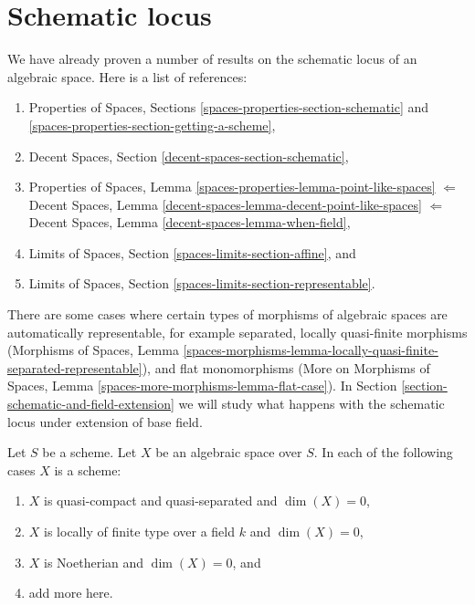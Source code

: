 \section{Schematic locus}
\label{section-schematic}

\noindent
We have already proven a number of results on the schematic locus
of an algebraic space. Here is a list of references:
\begin{enumerate}
\item Properties of Spaces, Sections
\ref{spaces-properties-section-schematic} and
\ref{spaces-properties-section-getting-a-scheme},
\item Decent Spaces, Section \ref{decent-spaces-section-schematic},
\item Properties of Spaces, Lemma
\ref{spaces-properties-lemma-point-like-spaces}
$\Leftarrow$
Decent Spaces, Lemma \ref{decent-spaces-lemma-decent-point-like-spaces}
$\Leftarrow$
Decent Spaces, Lemma \ref{decent-spaces-lemma-when-field},
\item Limits of Spaces, Section \ref{spaces-limits-section-affine}, and
\item Limits of Spaces, Section \ref{spaces-limits-section-representable}.
\end{enumerate}
There are some cases where certain types of morphisms of algebraic spaces
are automatically representable, for example
separated, locally quasi-finite morphisms (Morphisms of Spaces, Lemma
\ref{spaces-morphisms-lemma-locally-quasi-finite-separated-representable}),
and flat monomorphisms (More on Morphisms of Spaces, Lemma
\ref{spaces-more-morphisms-lemma-flat-case}).
In Section \ref{section-schematic-and-field-extension}
we will study what happens with the schematic
locus under extension of base field.

\begin{lemma}
\label{lemma-locally-finite-type-dim-zero}
Let $S$ be a scheme. Let $X$ be an algebraic space over $S$.
In each of the following cases $X$ is a scheme:
\begin{enumerate}
\item $X$ is quasi-compact and quasi-separated and $\dim(X) = 0$,
\item $X$ is locally of finite type over a field $k$ and $\dim(X) = 0$,
\item $X$ is Noetherian and $\dim(X) = 0$, and
\item add more here.
\end{enumerate}
\end{lemma}


